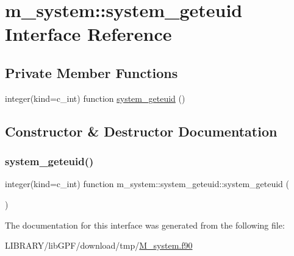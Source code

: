 \hypertarget{interfacem__system_1_1system__geteuid}{}\section{m\+\_\+system\+:\+:system\+\_\+geteuid Interface Reference}
\label{interfacem__system_1_1system__geteuid}
\subsection*{Private Member Functions}
\begin{DoxyCompactItemize}
\item 
integer(kind=c\+\_\+int) function \hyperlink{interfacem__system_1_1system__geteuid_af9661841f8178c662ba33a85a938183e}{system\+\_\+geteuid} ()
\end{DoxyCompactItemize}


\subsection{Constructor \& Destructor Documentation}
\mbox{\label{interfacem__system_1_1system__geteuid_af9661841f8178c662ba33a85a938183e}} 
\subsubsection{\texorpdfstring{system\+\_\+geteuid()}{system\_geteuid()}}
{\footnotesize\ttfamily integer(kind=c\+\_\+int) function m\+\_\+system\+::system\+\_\+geteuid\+::system\+\_\+geteuid (\begin{DoxyParamCaption}{ }\end{DoxyParamCaption})\hspace{0.3cm}{\ttfamily [private]}}



The documentation for this interface was generated from the following file\+:\begin{DoxyCompactItemize}
\item 
L\+I\+B\+R\+A\+R\+Y/lib\+G\+P\+F/download/tmp/\hyperlink{M__system_8f90}{M\+\_\+system.\+f90}\end{DoxyCompactItemize}
